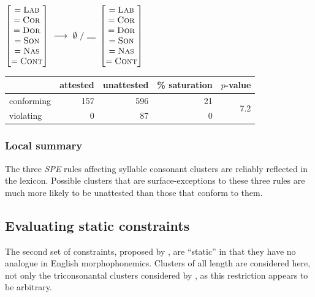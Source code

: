 \begin{example}
$\begin{bmatrix} =\textsc{Lab} \\ =\textsc{Cor} \\ =\textsc{Dor} \\ =\textsc{Son} \\ =\textsc{Nas} \\ =\textsc{Cont} \end{bmatrix}~\goesto~\zero~/~\gap~\begin{bmatrix} =\textsc{Lab} \\ =\textsc{Cor} \\ =\textsc{Dor} \\ =\textsc{Son} \\ =\textsc{Nas} \\ =\textsc{Cont} \end{bmatrix}$
\end{example}


\begin{example}
\begin{tabular}{l r r r r}
\toprule
           & attested & unattested & \% saturation & $p$-value                   \\
\midrule
conforming & 157      & 596        & 21      & \multirow{2}{*}{7.2\e{-09}} \\
violating  & 0        &  87        & 0                                    \\
\bottomrule
\end{tabular}
\end{example}

\subsubsection{Local summary}

The three \emph{SPE} rules affecting syllable consonant clusters are reliably reflected in the lexicon. Possible clusters that are surface-exceptions to these three rules are much more likely to be unattested than those that conform to them.

\subsection{Evaluating static constraints}

The second set of constraints, proposed by \citet{Pierrehumbert1994}, are ``static'' in that they have no analogue in English morphophonemics. Clusters of all length are considered here, not only the triconsonantal clusters considered by \citeauthor{Pierrehumbert1994}, as this restriction appears to be arbitrary.

